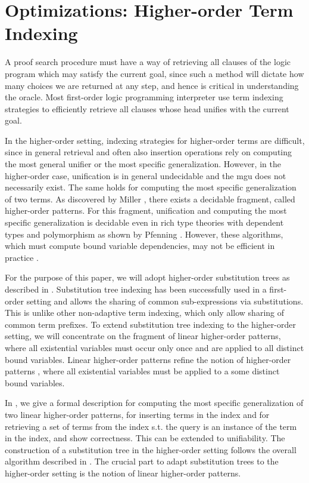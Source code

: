 \documentclass{acmconf}
\begin{document}
\section{Optimizations: Higher-order Term Indexing}

A proof search procedure must have a way of retrieving all clauses of
the logic program which may satisfy the current goal, since such a
method will dictate how many choices we are returned at any step, and
hence is critical in understanding the oracle. Most first-order logic
programming interpreter use term indexing strategies to efficiently
retrieve all clauses whose head unifies with the current goal.

In the higher-order setting, indexing strategies for higher-order
terms are difficult, since in general retrieval and often also
insertion operations rely on computing the most general unifier or the
most specific generalization. However, in the higher-order case,
unification is in general undecidable and the mgu does not necessarily
exist. The same holds for computing the most specific generalization
of two terms. As discovered by Miller \cite{Miller91iclp}, there exists a decidable
fragment, called higher-order patterns. For this fragment, unification
and computing the most specific generalization is decidable even in
rich type theories with dependent types and polymorphism as shown by
Pfenning \cite{Pfenning91lics}.  However, these algorithms, which must
compute bound variable dependencies, may not be efficient in practice
\cite{PientkaPfenning:CADE03}.  

For the purpose of this paper, we will adopt higher-order substitution
trees as described in \cite{Pientka:ICLP03}. Substitution tree
indexing has been successfully used in a first-order setting \cite{Graf+Book95} and
allows the sharing of common sub-expressions via substitutions. This
is unlike other non-adaptive term indexing, which only allow sharing
of common term prefixes. To extend substitution tree indexing to the
higher-order setting, we will concentrate on the fragment of linear
higher-order patterns, where all existential variables must occur only
once and are applied to all distinct bound variables. Linear
higher-order patterns refine the notion of higher-order patterns
\cite{Miller91iclp}, where all existential variables must be applied
to a some distinct bound variables. 

 In \cite{Pientka:ICLP03,Pientka03phd}, we give a formal 
description for computing the most specific generalization of two
linear higher-order patterns, for inserting terms in the index and for
retrieving a set of terms from the index s.t. the query is an instance
of the term in the index, and show correctness. This can be extended
to unifiability. The construction of a substitution tree in the
higher-order setting follows the overall algorithm described in
\cite{Ramakrishnan01:indexing}. The crucial part to adapt substitution
trees to the higher-order setting is the notion of linear higher-order
patterns.
\end{document}
